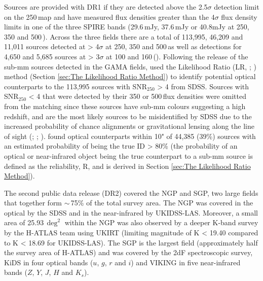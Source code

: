 Sources are provided with DR1 if they are detected above the 2.5$\sigma$ detection limit on the 250\,\micron map and have measured flux densities greater than the 4$\sigma$ flux density limits in one of the three SPIRE bands (29.6\,mJy, 37.6\,mJy or 40.8mJy at 250, 350 and 500\,\micron). Across the three fields there are a total of 113,995, 46,209 and 11,011 sources detected at > 4$\sigma$ at 250, 350 and 500\,\micron as well as detections for 4,650 and 5,685 sources at > 3$\sigma$ at 100 and 160\,\micron (\citealt{Valiante_2016}). Following the release of the sub-mm sources detected in the GAMA fields, \citealt{Bourne_2016} used the Likelihood Ratio (LR, \citealt{Sutherland_1992}; \citealt{Ciliegi_2003}) method (Section \ref{sec:The Likelihood Ratio Method}) to identify potential optical counterparts to the 113,995 sources with SNR$_{250}$ > 4 from SDSS. Sources with SNR$_{250}$ < 4 that were detected by their 350 or 500\,\micron flux densities were omitted from the matching since these sources have sub-mm colours suggesting a high redshift, and are the most likely sources to be misidentified by SDSS due to the increased probability of chance alignments or gravitational lensing along the line of sight (\citealt{Negrello_2010}; \citealt{Pearson_2013}; \citealt{Bourne_2014}). \citealt{Bourne_2016} found optical counterparts within 10" of 44,385 (39\%) sources with an estimated probability of being the true ID > 80\% (the probability of an optical or near-infrared object being the true counterpart to a sub-mm source is defined as the reliability, R, and is derived in Section \ref{sec:The Likelihood Ratio Method}).

The second public data release (DR2) covered the NGP and SGP, two large fields that together form $\sim$\,75\% of the total survey area. The NGP was covered in the optical by the SDSS and in the near-infrared by UKIDSS-LAS. Moreover, a small area of 25.93\,$\deg^2$ within the NGP was also observed by a deeper K-band survey by the H-ATLAS team using UKIRT (limiting magnitude of K < 19.40 compared to K < 18.69 for UKIDSS-LAS). The SGP is the largest field (approximately half the survey area of H-ATLAS) and was covered by the 2dF spectroscopic survey, KiDS in four optical bands ($u$, $g$, $r$ and $i$) and VIKING in five near-infrared bands ($Z$, $Y$, $J$, $H$ and $K_s$).

